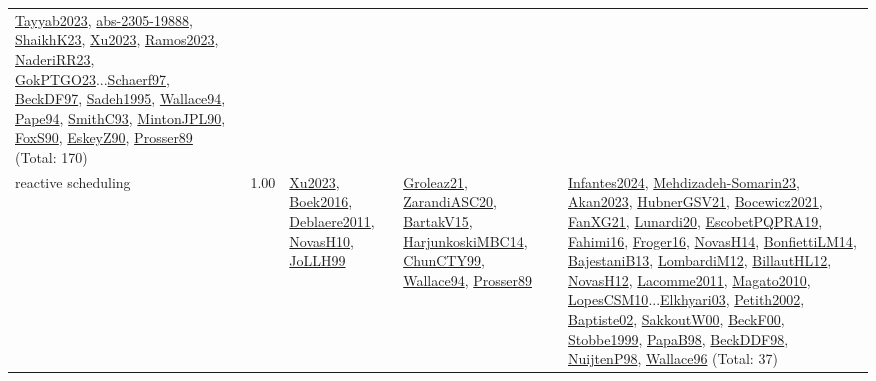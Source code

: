 {\begin{longtable}{p{3cm}r>{\raggedright\arraybackslash}p{6cm}>{\raggedright\arraybackslash}p{6cm}>{\raggedright\arraybackslash}p{8cm}}
\hyperref[detail:Tayyab2023]{Tayyab2023}, \hyperref[detail:abs-2305-19888]{abs-2305-19888}, \hyperref[detail:ShaikhK23]{ShaikhK23}, \hyperref[detail:Xu2023]{Xu2023}, \hyperref[detail:Ramos2023]{Ramos2023}, \hyperref[detail:NaderiRR23]{NaderiRR23}, \hyperref[detail:GokPTGO23]{GokPTGO23}...\hyperref[detail:Schaerf97]{Schaerf97}, \hyperref[detail:BeckDF97]{BeckDF97}, \hyperref[detail:Sadeh1995]{Sadeh1995}, \hyperref[detail:Wallace94]{Wallace94}, \hyperref[detail:Pape94]{Pape94}, \hyperref[detail:SmithC93]{SmithC93}, \hyperref[detail:MintonJPL90]{MintonJPL90}, \hyperref[detail:FoxS90]{FoxS90}, \hyperref[detail:EskeyZ90]{EskeyZ90}, \hyperref[detail:Prosser89]{Prosser89} (Total: 170)\\
\index{reactive scheduling}\index{Concepts!reactive scheduling}reactive scheduling &  1.00 & \hyperref[detail:Xu2023]{Xu2023}, \hyperref[detail:Boek2016]{Boek2016}, \hyperref[detail:Deblaere2011]{Deblaere2011}, \hyperref[detail:NovasH10]{NovasH10}, \hyperref[detail:JoLLH99]{JoLLH99} & \hyperref[detail:Groleaz21]{Groleaz21}, \hyperref[detail:ZarandiASC20]{ZarandiASC20}, \hyperref[detail:BartakV15]{BartakV15}, \hyperref[detail:HarjunkoskiMBC14]{HarjunkoskiMBC14}, \hyperref[detail:ChunCTY99]{ChunCTY99}, \hyperref[detail:Wallace94]{Wallace94}, \hyperref[detail:Prosser89]{Prosser89} & \hyperref[detail:Infantes2024]{Infantes2024}, \hyperref[detail:Mehdizadeh-Somarin23]{Mehdizadeh-Somarin23}, \hyperref[detail:Akan2023]{Akan2023}, \hyperref[detail:HubnerGSV21]{HubnerGSV21}, \hyperref[detail:Bocewicz2021]{Bocewicz2021}, \hyperref[detail:FanXG21]{FanXG21}, \hyperref[detail:Lunardi20]{Lunardi20}, \hyperref[detail:EscobetPQPRA19]{EscobetPQPRA19}, \hyperref[detail:Fahimi16]{Fahimi16}, \hyperref[detail:Froger16]{Froger16}, \hyperref[detail:NovasH14]{NovasH14}, \hyperref[detail:BonfiettiLM14]{BonfiettiLM14}, \hyperref[detail:BajestaniB13]{BajestaniB13}, \hyperref[detail:LombardiM12]{LombardiM12}, \hyperref[detail:BillautHL12]{BillautHL12}, \hyperref[detail:NovasH12]{NovasH12}, \hyperref[detail:Lacomme2011]{Lacomme2011}, \hyperref[detail:Magato2010]{Magato2010}, \hyperref[detail:LopesCSM10]{LopesCSM10}...\hyperref[detail:Elkhyari03]{Elkhyari03}, \hyperref[detail:Petith2002]{Petith2002}, \hyperref[detail:Baptiste02]{Baptiste02}, \hyperref[detail:SakkoutW00]{SakkoutW00}, \hyperref[detail:BeckF00]{BeckF00}, \hyperref[detail:Stobbe1999]{Stobbe1999}, \hyperref[detail:PapaB98]{PapaB98}, \hyperref[detail:BeckDDF98]{BeckDDF98}, \hyperref[detail:NuijtenP98]{NuijtenP98}, \hyperref[detail:Wallace96]{Wallace96} (Total: 37)\\

\end{longtable}}
